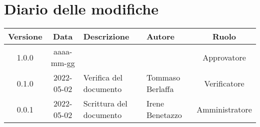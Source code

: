 \section*{Diario delle modifiche}
	\begin{center}
	\renewcommand{\arraystretch}{1.8} %
	\begin{tabular}{ |c|c|m{12em}|m{7em}|c| }
	\hline
	\textbf{Versione} & \textbf{Data} & \textbf{Descrizione} &  \textbf{Autore} &  \textbf{Ruolo} \\ %
	\hline
	1.0.0 & aaaa-mm-gg & & & Approvatore\\
	\hline
	0.1.0 & 2022-05-02 & Verifica del documento & Tommaso Berlaffa & Verificatore\\
	\hline
    0.0.1 & 2022-05-02 & Scrittura del documento & Irene Benetazzo & Amministratore\\ 
	\hline
	\end{tabular}
	\end{center}
	\newpage